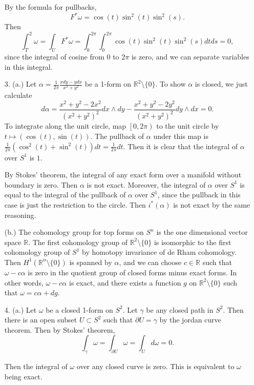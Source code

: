 \documentclass[11pt, reqno]{article}
\theoremstyle{plain}
\theoremstyle{definition}
\theoremstyle{remark}
\newcommand{\RR}{\mathbb{R}}
\begin{document}
\begin{enumerate}
    By the formula for pullbacks, 
    \[
        F^*\omega = \cos(t)\sin^2(t)\sin^2(s).
    \]
    Then
    \[
        \int_T^2 \omega = \int_U F^* \omega = \int_0^{2\pi}\int_0^{2\pi}\cos(t)\sin^2(t)\sin^2(s)dt ds = 0,
    \]
    since the integral of cosine from 0 to $2\pi$ is zero, and we can separate variables in this integral. 

    \item[3.] (a.) Let $\alpha = \frac{1}{2\pi}\frac{x dy - y dx}{x^2 + y^2}$ be a 1-form on $\RR^2 \setminus \{0\}$.
    To show $\alpha$ is closed, we just calculate 
    \[
        d\alpha = \frac{x^2 + y^2 - 2x^2}{(x^2 + y^2)^2}dx \wedge dy - \frac{x^2 + y^2 - 2y^2}{(x^2 + y^2)^2}dy \wedge dx
        = 0.
    \]
    To integrate along the unit circle, map $\left[0,2\pi\right)$ to the unit circle by $t \mapsto (\cos(t),\sin(t))$.
    The pullback of $\alpha$ under this map is $\frac{1}{2\pi}(\cos^2(t) + \sin^2(t))dt = \frac{1}{2\pi}dt$. Then
    it is clear that the integral of $\alpha$ over $S^1$ is $1$. 

    By Stokes' theorem, the integral of any exact form over a manifold without boundary is zero. 
    Then $\alpha$ is not exact. Moreover, the integral of $\alpha$ over $S^1$ is equal to
    the integral of the pullback of $\alpha$ over $S^1$, since the pullback in this case is just the restriction
    to the circle. Then $i^*(\alpha)$ is not exact by the same reasoning.

    (b.) The cohomology group for top forms on $S^n$ is the one dimensional vector space $\RR$. The first 
    cohomology group of $\RR^2\setminus \{0\}$ is isomorphic to the first cohomology group of $S^1$ by
    homotopy invariance of de Rham cohomology. Then $H^1(\RR^n\setminus\{0\})$ is spanned by $\alpha$, and 
    we can choose $c \in \RR$ such that $\omega - c\alpha$ is zero in the quotient group of closed
    forms minus exact forms. In other words, $\omega - c\alpha$ is exact, and there exists a function $g$ 
    on $\RR^2 \setminus\{0\}$ such that $\omega = c\alpha + dg$.

    \item[4.] (a.) Let $\omega$ be a closed 1-form on $S^2$. Let $\gamma$ be any closed path in $S^2$. Then
    there is an open subset $U \subset S^2$ such that $\partial U = \gamma$ by the jordan curve theorem.
    Then by Stokes' theorem,
    \[
        \int_\gamma \omega = \int_{\partial U}\omega = \int_U d\omega = 0.
    \]

    Then the integral of $\omega$ over any closed curve is zero. This is equivalent to $\omega$ being exact. 


\end{enumerate}
\end{document}
